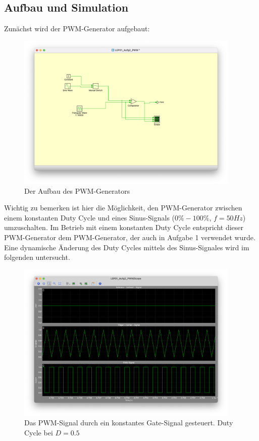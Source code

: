 \documentclass{report}
\begin{document}
\subsection{Aufbau und Simulation}

Zunächst wird der PWM-Generator aufgebaut: 

\begin{figure}
  \begin{center}
  \includegraphics[width=0.95\textwidth]{assets/img/aufg2_aufbau_pwm.png}
  \end{center}
  \caption{Der Aufbau des PWM-Generators}
  \label{fig:aufg2_aufbau_pwm}
\end{figure}


Wichtig zu bemerken ist hier die Möglichkeit, den PWM-Generator zwischen einem konstanten Duty Cycle und eines Sinus-Signals ($0\% - 100\%$, $f=50Hz$) umzuschalten. Im Betrieb mit einem konstanten Duty Cycle entspricht dieser PWM-Generator dem PWM-Generator, der auch in Aufgabe 1 verwendet wurde. Eine dynamische Änderung des Duty Cycles mittels des Sinus-Signales wird im folgenden untersucht.

\begin{figure}
  \begin{center}
    \includegraphics[width=0.95\textwidth]{assets/img/aufg2_pwm_c.png}
  \end{center}
  \caption{Das PWM-Signal durch ein konstantes Gate-Signal gesteuert. Duty Cycle bei $D=0.5$}
  \label{fig:aufg2_pwm_c}
\end{figure}
\end{document}
